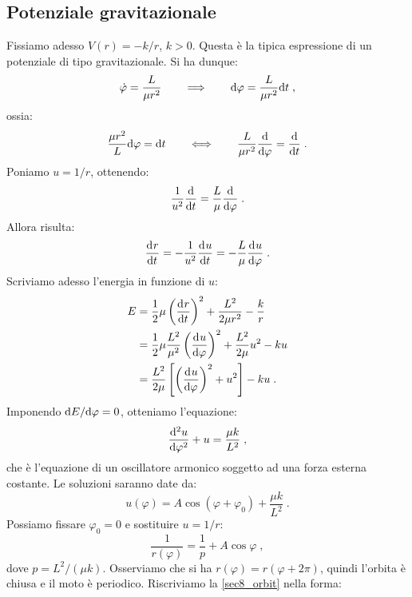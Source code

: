 \subsection{Potenziale gravitazionale}
Fissiamo adesso $V(r)=-k/r$, $k>0$. Questa è la tipica espressione di un potenziale di tipo gravitazionale. Si ha dunque:
\begin{equation}
\dot{\varphi}=\frac{L}{\mu r^2}\qquad \Longrightarrow\qquad \diff{\varphi}=\frac{L}{\mu r^2}\diff{t}\;,
\end{equation}
ossia:
\begin{equation}
\frac{\mu r^2}{L}\diff{\varphi}=\diff{t}\qquad \Longleftrightarrow\qquad \frac{L}{\mu r^2}\frac{\diff}{\diff{\varphi}}=\frac{\diff}{\diff{t}}\;.
\end{equation}
Poniamo $u=1/r$, ottenendo:
\begin{equation}
\frac{1}{u^2}\frac{\diff}{\diff[t]}=\frac{L}{\mu}\frac{\diff}{\diff[\varphi]}\;.
\end{equation}
Allora risulta:
\begin{equation}
\dev{r}{t}=-\frac{1}{u^2}\dev{u}{t}=-\frac{L}{\mu}\dev{u}{\varphi}\;.
\end{equation}
Scriviamo adesso l'energia in funzione di $u$:
\begin{align}
E&=\frac{1}{2}\mu\left(\dev{r}{t}\right)^2+\frac{L^2}{2\mu r^2}-\frac{k}{r} \notag \\
&= \frac{1}{2}\mu \frac{L^2}{\mu^2}\left(\dev{u}{\varphi}\right)^2+\frac{L^2}{2\mu}u^2-ku \notag \\
&= \frac{L^2}{2\mu}\left[\left(\dev{u}{\varphi}\right)^2+u^2\right]-ku\;.
\end{align}
Imponendo $\diff[E]/\diff[\varphi]=0$, otteniamo l'equazione:
\begin{equation}
\dev[2]{u}{\varphi}+u=\frac{\mu k}{L^2}\;,
\end{equation}
che è l'equazione di un oscillatore armonico soggetto ad una forza esterna costante. Le soluzioni saranno date da:
\begin{equation}
u(\varphi)=A\cos(\varphi+\varphi_0)+\frac{\mu k}{L^2}\;.
\end{equation}
Possiamo fissare $\varphi_0=0$ e sostituire $u=1/r$:
\begin{equation}
\frac{1}{r(\varphi)}=\frac{1}{p}+A\cos\varphi\;, \label{sec8_orbit}
\end{equation}
dove $p=L^2/(\mu k)$. Osserviamo che si ha $r(\varphi)=r(\varphi+2\pi)$, quindi l'orbita è chiusa e il moto è periodico. Riscriviamo la \eqref{sec8_orbit} nella forma:
